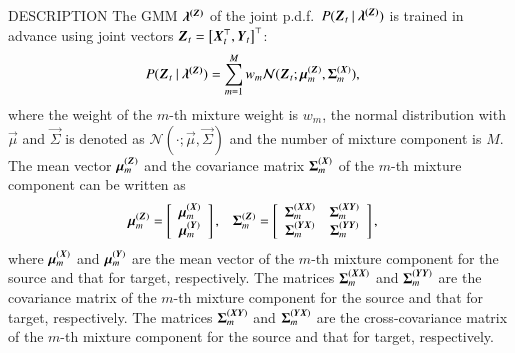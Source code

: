\begin{qsection}{DESCRIPTION}
 The GMM $\vec{\lambda\dim{\sZ}}$ of the joint p.d.f.~$P(\vec{Z}_{t}\mid
 \vec{\lambda\dim{\sZ}})$ is trained in advance using joint vectors $\vec{Z}_{t} =
 \left[\vec{X}_{t}\trans,\vec{Y}_{t} \right]\trans$:
 \begin{align*}
  P(\vec{Z}_{t}\mid \vec{\lambda\dim{\sZ}})
  &= \Sum_{m=1}^{M}w_{m} \mathcal{N}(\vec{Z}_{t}; \vec{\mu}\dim{\sZ}_{m},
  \vec{\Sigma}\dim{\sX}_{m}),
 \end{align*}
 where the weight of the $m$-th mixture weight is $w_m$,
 the normal distribution with $\vec{\mu}$ and $\vec{\Sigma}$ is denoted as
 $\mathcal{N}(\cdot; \vec{\mu}, \vec{\Sigma})$ and the number of mixture component is
 $M$.  The mean vector $\vec{\mu}\dim{\sZ}_{m}$ and the covariance matrix
 $\vec{\Sigma}\dim{\sX}_{m}$ of the $m$-th mixture component can be written as
 \begin{align*}
  \vec{\mu}\dim{\sZ}_{m}
  &=
  \left[
  \begin{array}{c}
   \vec{\mu}\dim{\sX}_{m} \\
   \vec{\mu}\dim{\sY}_{m}
  \end{array}
  \right],
  \;\;\;
  \vec{\Sigma}\dim{\sZ}_{m} =
  \left[
  \begin{array}{cc}
   \vec{\Sigma}\dim{\sX\sX}_{m} & \vec{\Sigma}\dim{\sX\sY}_{m}\\
   \vec{\Sigma}\dim{\sY\sX}_{m} & \vec{\Sigma}\dim{\sY\sY}_{m}
  \end{array}
  \right],
 \end{align*}
 where $\vec{\mu}\dim{\sX}_{m}$ and $\vec{\mu}\dim{\sY}_{m}$ are the mean vector of
 the $m$-th mixture component for the source and that for target, respectively. The
 matrices $\vec{\Sigma}\dim{\sX\sX}_{m}$ and $\vec{\Sigma}\dim{\sY\sY}_{m}$ are the
 covariance matrix of the $m$-th mixture component for the source and that for
 target, respectively.  The matrices $\vec{\Sigma}\dim{\sX\sY}_{m}$ and
 $\vec{\Sigma}\dim{\sY\sX}_{m}$ are the cross-covariance matrix of the $m$-th mixture
 component for the source and that for target, respectively.


\end{qsection}
